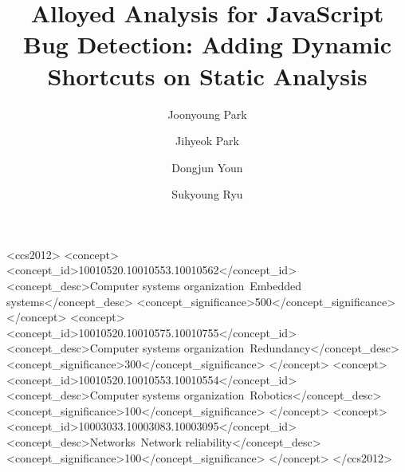 \documentclass[sigplan,10pt,review,anonymous]{acmart}\settopmatter{printfolios=true,printccs=false,printacmref=false}
\begin{document}
\title{Alloyed Analysis for JavaScript Bug Detection: Adding Dynamic Shortcuts on Static Analysis}

\author{Joonyoung Park}

\author{Jihyeok Park}

\author{Dongjun Youn}

\author{Sukyoung Ryu}

\renewcommand{\shortauthors}{Park and Park, et al.}



\begin{CCSXML}
<ccs2012>
 <concept>
  <concept_id>10010520.10010553.10010562</concept_id>
  <concept_desc>Computer systems organization~Embedded systems</concept_desc>
  <concept_significance>500</concept_significance>
 </concept>
 <concept>
  <concept_id>10010520.10010575.10010755</concept_id>
  <concept_desc>Computer systems organization~Redundancy</concept_desc>
  <concept_significance>300</concept_significance>
 </concept>
 <concept>
  <concept_id>10010520.10010553.10010554</concept_id>
  <concept_desc>Computer systems organization~Robotics</concept_desc>
  <concept_significance>100</concept_significance>
 </concept>
 <concept>
  <concept_id>10003033.10003083.10003095</concept_id>
  <concept_desc>Networks~Network reliability</concept_desc>
  <concept_significance>100</concept_significance>
 </concept>
</ccs2012>
\end{CCSXML}


\keywords{\todo}

\maketitle











\end{document}
